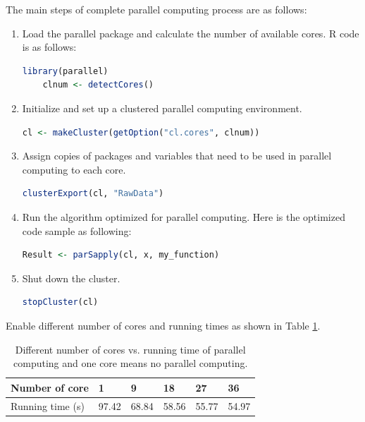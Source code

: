 \documentclass[a4paper,12pt,titlepage]{article} %
\numberwithin{equation}{section}  %
\begin{document}
	The main steps of complete parallel computing process are as follows:
	\begin{enumerate}
	\item  Load the parallel package and calculate the number of available cores. R code is as follows:
	\begin{lstlisting}[language=R]
	library(parallel) 
	clnum <- detectCores()
	\end{lstlisting}
	
	\item Initialize and set up a clustered parallel computing environment.
	
	\begin{lstlisting}[language=R]
	cl <- makeCluster(getOption("cl.cores", clnum))
	\end{lstlisting}
	
	\item Assign copies of packages and variables that need to be used in parallel computing to each core.
	
	\begin{lstlisting}[language=R]
	clusterExport(cl, "RawData")
	\end{lstlisting}
	
	\item Run the algorithm optimized for parallel computing.
Here is the optimized code sample as following:
	
	\begin{lstlisting}[language=R]
	Result <- parSapply(cl, x, my_function)
	\end{lstlisting}
	
	\item Shut down the cluster.
	
	
	\begin{lstlisting}[language=R]
	stopCluster(cl)
	\end{lstlisting}
	
	\end{enumerate}


	
	
	Enable different number of cores and running times as shown in Table \ref{parallel_time}. 
	
		\begin{table}[h]
		\centering
		\begin{tabular}{llllll}
			\hline
			Number of core & 1     & 9     & 18    & 27    & 36    \\ \hline
			Running time (s)  & 97.42 & 68.84 & 58.56 & 55.77 & 54.97 \\ \hline
		\end{tabular}
		\caption{Different number of cores vs. running time of parallel computing and one core means no parallel computing.}
		\label{parallel_time}
	\end{table}
	
\end{document}
